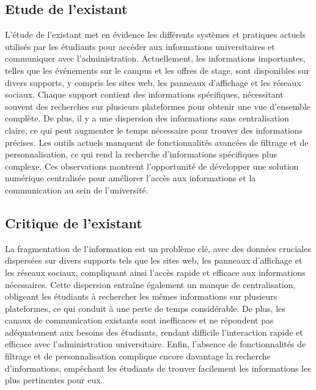 \begin{sloppypar}
\subsection{Etude de l’existant }
\vspace{-4mm}
L'étude de l'existant met en évidence les différents systèmes et pratiques actuels utilisés par les étudiants pour accéder aux informations universitaires et communiquer avec l'administration. Actuellement, les informations importantes, telles que les événements sur le campus et les offres de stage, sont disponibles sur divers supports, y compris les sites web, les panneaux d'affichage et les réseaux sociaux. Chaque support contient des informations spécifiques, nécessitant souvent des recherches sur plusieurs plateformes pour obtenir une vue d'ensemble complète. De plus, il y a une dispersion des informations sans centralisation claire, ce qui peut augmenter le temps nécessaire pour trouver des informations précises. Les outils actuels manquent de fonctionnalités avancées de filtrage et de personnalisation, ce qui rend la recherche d'informations spécifiques plus complexe. Ces observations montrent l'opportunité de développer une solution numérique centralisée pour améliorer l'accès aux informations et la communication au sein de l'université.
\vspace{-6mm}
\subsection{Critique de l’existant }
\vspace{-4mm}
La fragmentation de l'information est un problème clé, avec des données cruciales dispersées sur divers supports tels que les sites web, les panneaux d’affichage et les réseaux sociaux, compliquant ainsi l'accès rapide et efficace aux informations nécessaires. Cette dispersion entraîne également un manque de centralisation, obligeant les étudiants à rechercher les mêmes informations sur plusieurs plateformes, ce qui conduit à une perte de temps considérable. De plus, les canaux de communication existants sont inefficaces et ne répondent pas adéquatement aux besoins des étudiants, rendant difficile l'interaction rapide et efficace avec l'administration universitaire. Enfin, l'absence de fonctionnalités de filtrage et de personnalisation complique encore davantage la recherche d’informations, empêchant les étudiants de trouver facilement les informations les plus pertinentes pour eux.
\vspace{-6mm}

\end{sloppypar}
